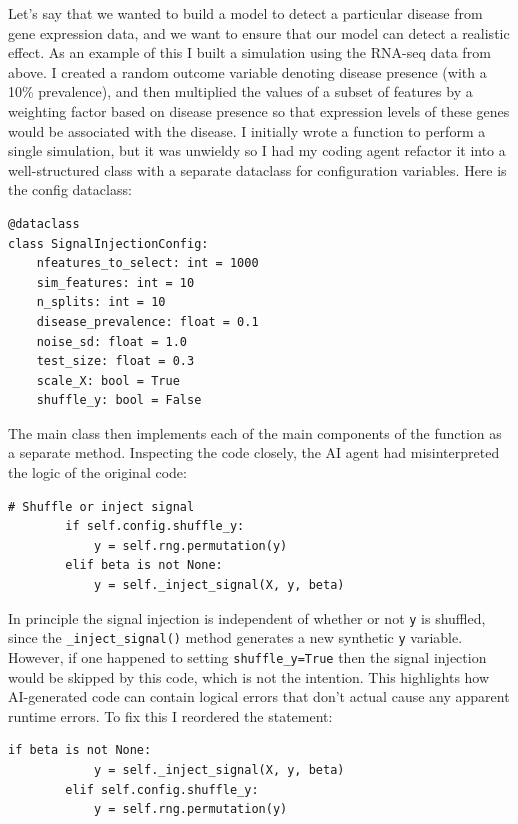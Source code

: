 Let's say that we wanted to build a model to detect a particular disease from gene expression data, and we want to ensure that our model can detect a realistic effect.  As an example of this I built a simulation using the RNA-seq data from above. I created a random outcome variable denoting disease presence (with a 10\% prevalence), and then multiplied the values of a subset of features by a weighting factor based on disease presence so that expression levels of these genes would be associated with the disease.  I initially wrote a function to perform a single simulation, but it was unwieldy so I had my coding agent refactor it into a well-structured class with a separate dataclass for configuration variables. Here is the config dataclass:

\begin{lstlisting}[style=Python]
@dataclass
class SignalInjectionConfig:
    nfeatures_to_select: int = 1000
    sim_features: int = 10
    n_splits: int = 10
    disease_prevalence: float = 0.1
    noise_sd: float = 1.0
    test_size: float = 0.3
    scale_X: bool = True
    shuffle_y: bool = False
\end{lstlisting}

The main class then implements each of the main components of the function as a separate method.  Inspecting the code closely, the AI agent had misinterpreted the logic of the original code:

\begin{lstlisting}[style=Python]
# Shuffle or inject signal
        if self.config.shuffle_y:
            y = self.rng.permutation(y)
        elif beta is not None:
            y = self._inject_signal(X, y, beta)
\end{lstlisting}

In principle the signal injection is independent of whether or not \texttt{y} is shuffled, since the \texttt{\_inject\_signal()} method generates a new synthetic \texttt{y} variable.  However, if one happened to setting \texttt{shuffle\_y=True} then the signal injection would be skipped by this code, which is not the intention.  This highlights how AI-generated code can contain logical errors that don't actual cause any apparent runtime errors.  To fix this I reordered the statement:

\begin{lstlisting}[style=Python]
        if beta is not None:
            y = self._inject_signal(X, y, beta)
        elif self.config.shuffle_y:
            y = self.rng.permutation(y)
\end{lstlisting}

